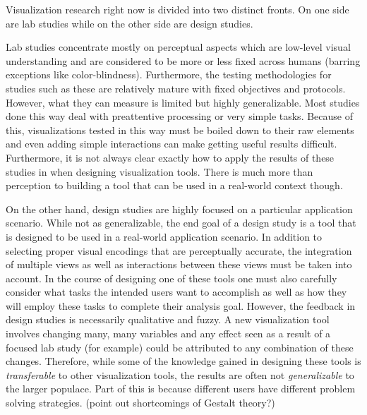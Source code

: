 Visualization research right now is divided into two distinct fronts. On
one side are lab studies while on the other side are design studies.

Lab studies concentrate mostly on perceptual aspects which are low-level visual
understanding and are considered to be more or less fixed across humans
(barring exceptions like color-blindness). Furthermore, the testing
methodologies for studies such as these are relatively mature with fixed
objectives and protocols. However, what they can measure is limited but highly
generalizable. Most studies done this way deal with preattentive processing or
very simple tasks. Because of this, visualizations tested in this way must be
boiled down to their raw elements and even adding simple interactions can make
getting useful results difficult.  Furthermore, it is not always clear exactly
how to apply the results of these studies in when designing visualization
tools. There is much more than perception to building a tool that can be used
in a real-world context though.

On the other hand, design studies are highly focused on a particular
application scenario. While not as generalizable, the end goal of a design
study is a tool that is designed to be used in a real-world application
scenario. In addition to selecting proper visual encodings that are
perceptually accurate, the integration of multiple views as well as
interactions between these views must be taken into account. In the course of
designing one of these tools one must also carefully consider what tasks the
intended users want to accomplish as well as how they will employ these tasks
to complete their analysis goal. However, the feedback in design studies is
necessarily qualitative and fuzzy. A new visualization tool involves changing
many, many variables and any effect seen as a result of a focused lab study
(for example) could be attributed to any combination of these changes.
Therefore, while some of the knowledge gained in designing these tools is
\emph{transferable} to other visualization tools, the results are often not
\emph{generalizable} to the larger populace. Part of this is because different
users have different problem solving strategies. (point out shortcomings of
Gestalt theory?)

